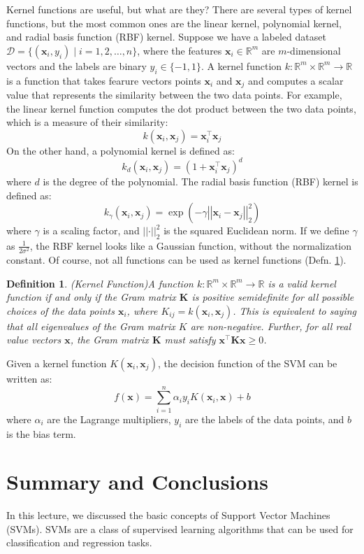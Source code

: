 \documentclass{article}[11pt]
\newtheorem{defn}{Definition}
\def\R{\mathbb{R}}
\def\D{\mathcal{D}}
\newcommand{\norm}[1]{\left|\left|#1\right|\right|}
\begin{document}
Kernel functions are useful, but what are they? There are several types of kernel functions, but the most common ones are the linear kernel, polynomial kernel, and radial basis function (RBF) kernel.
Suppose we have a labeled dataset $\D = \{(\mathbf{x}_{i},y_{i}) \mid i = 1,2,\dots,n\}$, where the features $\mathbf{x}_i \in \mathbb{R}^{m}$ are $m$-dimensional vectors and the labels are binary $y_i \in \{-1,1\}$.
A kernel function $k:\mathbb{R}^{m}\times\R^{m}\to\R$ is a function that takes fearure vectors points $\mathbf{x}_i$ and $\mathbf{x}_j$ and computes a scalar value that represents the similarity between the two data points.
For example, the linear kernel function computes the dot product between the two data points, which is a measure of their similarity:
\begin{equation}
k(\mathbf{x}_i, \mathbf{x}_j) = \mathbf{x}_i^{\top}\mathbf{x}_j
\end{equation}
On the other hand, a polynomial kernel is defined as:
\begin{equation}
k_{d}(\mathbf{x}_i, \mathbf{x}_j) = (1+\mathbf{x}_i^{\top}\mathbf{x}_j)^d
\end{equation}
where $d$ is the degree of the polynomial. The radial basis function (RBF) kernel is defined as:
\begin{equation}
k_{\gamma}(\mathbf{x}_i, \mathbf{x}_j) = \exp(-\gamma \norm{\mathbf{x}_i - \mathbf{x}_j}_{2}^2)
\end{equation}
where $\gamma$ is a scaling factor, and $\norm{\cdot}^{2}_{2}$ is the squared Euclidean norm.
If we define $\gamma$ as $\frac{1}{2\sigma^2}$, the RBF kernel looks like a Gaussian function, without the normalization constant.
Of course, not all functions can be used as kernel functions (Defn. \ref{def:kernel-valid}).

\begin{defn}{(Kernel Function)}\label{def:kernel-valid}
A function $k:\mathbb{R}^{m}\times\R^{m}\to\R$ is a valid kernel function if and only if the Gram matrix $\mathbf{K}$ is positive 
semidefinite for all possible choices of the data points $\mathbf{x}_i$, where $K_{ij} = k(\mathbf{x}_i, \mathbf{x}_j)$.
This is equivalent to saying that all eigenvalues of the Gram matrix $K$ are non-negative.
Further, for all real value vectors $\mathbf{x}$, the Gram matrix $\mathbf{K}$ must satisfy $\mathbf{x}^{\top}\mathbf{K}\mathbf{x} \geq 0$.
\end{defn}


Given a kernel function $K(\mathbf{x}_i, \mathbf{x}_j)$, the decision function of the SVM can be written as:
\begin{equation}
f(\mathbf{x}) = \sum_{i=1}^{n} \alpha_i y_i K(\mathbf{x}_i, \mathbf{x}) + b
\end{equation}
where $\alpha_i$ are the Lagrange multipliers, $y_i$ are the labels of the data points, and $b$ is the bias term.



\section{Summary and Conclusions}
In this lecture, we discussed the basic concepts of Support Vector Machines (SVMs). 
SVMs are a class of supervised learning algorithms that can be used for classification and regression tasks.



\end{document}
